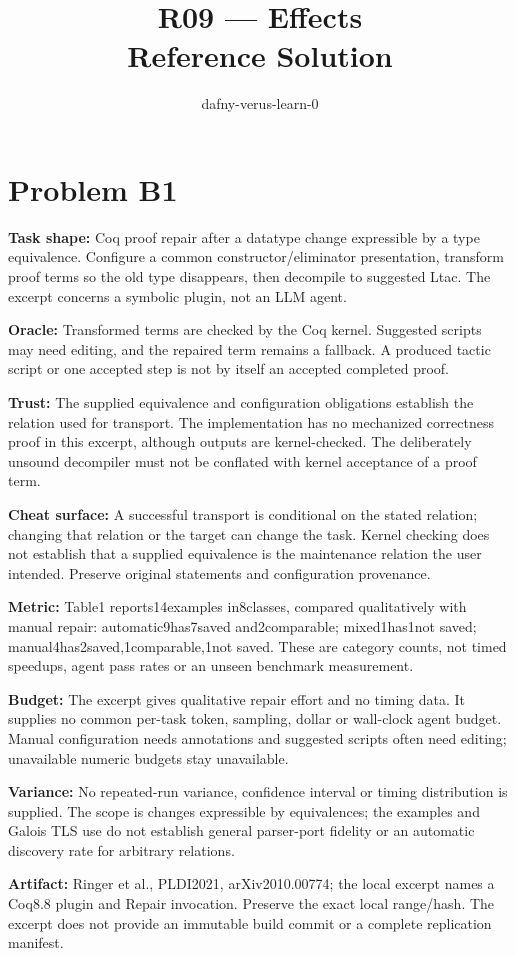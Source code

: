 \documentclass[11pt]{article}
\title{R09 --- Effects \\ \large Reference Solution}
\author{dafny-verus-learn-0}
\date{}
\begin{document}
\maketitle
\section*{Problem B1}\label{ans:B1}
\begin{answer}
\textbf{Task shape:} Coq proof repair after a datatype change expressible by a type equivalence. Configure a common constructor/eliminator presentation, transform proof terms so the old type disappears, then decompile to suggested Ltac. The excerpt concerns a symbolic plugin, not an LLM agent.

\textbf{Oracle:} Transformed terms are checked by the Coq kernel. Suggested scripts may need editing, and the repaired term remains a fallback. A produced tactic script or one accepted step is not by itself an accepted completed proof.

\textbf{Trust:} The supplied equivalence and configuration obligations establish the relation used for transport. The implementation has no mechanized correctness proof in this excerpt, although outputs are kernel-checked. The deliberately unsound decompiler must not be conflated with kernel acceptance of a proof term.

\textbf{Cheat surface:} A successful transport is conditional on the stated relation; changing that relation or the target can change the task. Kernel checking does not establish that a supplied equivalence is the maintenance relation the user intended. Preserve original statements and configuration provenance.

\textbf{Metric:} Table1 reports14examples in8classes, compared qualitatively with manual repair: automatic9has7saved and2comparable; mixed1has1not saved; manual4has2saved,1comparable,1not saved. These are category counts, not timed speedups, agent pass rates or an unseen benchmark measurement.

\textbf{Budget:} The excerpt gives qualitative repair effort and no timing data. It supplies no common per-task token, sampling, dollar or wall-clock agent budget. Manual configuration needs annotations and suggested scripts often need editing; unavailable numeric budgets stay unavailable.

\textbf{Variance:} No repeated-run variance, confidence interval or timing distribution is supplied. The scope is changes expressible by equivalences; the examples and Galois TLS use do not establish general parser-port fidelity or an automatic discovery rate for arbitrary relations.

\textbf{Artifact:} Ringer et al., PLDI2021, arXiv2010.00774; the local excerpt names a Coq8.8 plugin and Repair invocation. Preserve the exact local range/hash. The excerpt does not provide an immutable build commit or a complete replication manifest.
\end{answer}
\end{document}
